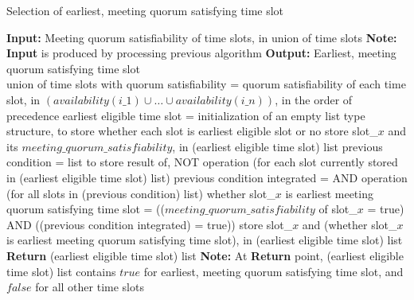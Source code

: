 \begin{algorithm}[H]
    \caption{Selection of earliest, meeting quorum satisfying time slot}
    \begin{algorithmic}
        \State \textbf{Input:} Meeting quorum satisfiability of time slots, in union of time slots
        \State \textbf{Note:} \textbf{Input} is produced by processing previous algorithm
        \State \textbf{Output:} Earliest, meeting quorum satisfying time slot \\
        \State union of time slots with quorum satisfiability = quorum satisfiability of each time slot, in \((availability(i\_1) \cup \dots \cup availability(i\_n))\), in the order of precedence
        \State earliest eligible time slot = initialization of an empty list type structure, to store whether each slot is earliest eligible slot or no
                \State store slot\_\(x\) and its \(meeting\_quorum\_satisfiability\), in (earliest eligible time slot) list     
            \Else
                \State previous condition = list to store result of, NOT operation (for each slot currently stored in (earliest eligible time slot) list)
                \State previous condition integrated = AND operation (for all slots in (previous condition) list) 
                \State whether slot\_\(x\) is earliest meeting quorum satisfying time slot = ((\(meeting\_quorum\_satisfiability\) of slot\_\(x\) = true) AND ((previous condition integrated) = true))
                \State store slot\_\(x\) and (whether slot\_\(x\) is earliest meeting quorum satisfying time slot), in (earliest eligible time slot) list                
            \EndIf
        \EndFor
        \State \textbf{Return} (earliest eligible time slot) list 
        \State \textbf{Note:} At \textbf{Return} point, (earliest eligible time slot) list contains \(true\) for earliest, meeting quorum satisfying time slot, and \(false\) for all other time slots
    \end{algorithmic}
\end{algorithm}

